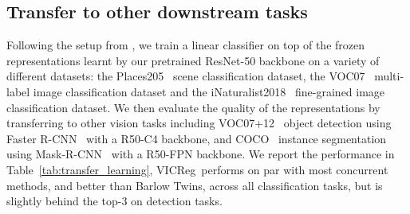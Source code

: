 \documentclass{article} %
\newcommand{\algo}{VICReg}
\begin{document}
\subsection{Transfer to other downstream tasks} \label{sec:eval_transfer}
Following the setup from \cite{misra2020pirl}, we train a linear classifier on top of the frozen representations learnt by our pretrained ResNet-50 backbone on a variety of different datasets: the Places205~\cite{zhou2014places} scene classification dataset, the VOC07~\cite{everingham2010voc} multi-label image classification dataset and the iNaturalist2018~\cite{vanhorni2018naturalist} fine-grained image classification dataset. We then evaluate the quality of the representations by transferring to other vision tasks including VOC07+12~\cite{everingham2010voc} object detection using Faster R-CNN~\cite{ren2015fasterrcnn} with a R50-C4 backbone, and COCO~\cite{lin2014coco} instance segmentation using Mask-R-CNN~\cite{he2017maskrcnn} with a R50-FPN backbone.  We report the performance in Table~\ref{tab:transfer_learning}, \algo \ performs on par with most concurrent methods, and better than Barlow Twins, across all classification tasks, but is slightly behind the top-3 on detection tasks. %
\end{document}

